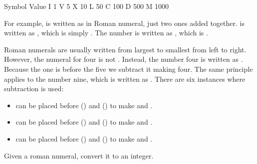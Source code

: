 \documentclass[letterpaper,12pt,english]{book}
\begin{document}
\begin{sphinxVerbatim}[commandchars=\\\{\}]
Symbol       Value
I             1
V             5
X             10
L             50
C             100
D             500
M             1000
\end{sphinxVerbatim}

\sphinxAtStartPar
For example,  is written as  in Roman numeral, just two ones added together.  is written as , which is simply . The number  is written as , which is .

\sphinxAtStartPar
Roman numerals are usually written from largest to smallest from left to right. However, the numeral for four is not . Instead, the number four is written as . Because the one is before the five we subtract it making four. The same principle applies to the number nine, which is written as . There are six instances where subtraction is used:
\begin{itemize}
\item {} 
\sphinxAtStartPar
{} can be placed before  () and  () to make  and .

\item {} 
\sphinxAtStartPar
{} can be placed before  () and  () to make  and .

\item {} 
\sphinxAtStartPar
{} can be placed before  () and  () to make  and .

\end{itemize}

\sphinxAtStartPar
Given a roman numeral, convert it to an integer.
\end{document}
